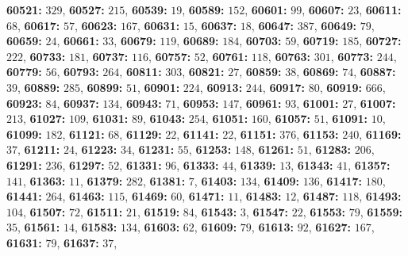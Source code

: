 \textsf{\bfseries 60521:} $329$, \textsf{\bfseries 60527:} $215$, \textsf{\bfseries 60539:} $19$, \textsf{\bfseries 60589:} $152$, \textsf{\bfseries 60601:} $99$, \textsf{\bfseries 60607:} $23$, \textsf{\bfseries 60611:} $68$, \textsf{\bfseries 60617:} $57$, \textsf{\bfseries 60623:} $167$, \textsf{\bfseries 60631:} $15$, \textsf{\bfseries 60637:} $18$, \textsf{\bfseries 60647:} $387$, \textsf{\bfseries 60649:} $79$, \textsf{\bfseries 60659:} $24$, \textsf{\bfseries 60661:} $33$, \textsf{\bfseries 60679:} $119$, \textsf{\bfseries 60689:} $184$, \textsf{\bfseries 60703:} $59$, \textsf{\bfseries 60719:} $185$, \textsf{\bfseries 60727:} $222$, \textsf{\bfseries 60733:} $181$, \textsf{\bfseries 60737:} $116$, \textsf{\bfseries 60757:} $52$, \textsf{\bfseries 60761:} $118$, \textsf{\bfseries 60763:} $301$, \textsf{\bfseries 60773:} $244$, \textsf{\bfseries 60779:} $56$, \textsf{\bfseries 60793:} $264$, \textsf{\bfseries 60811:} $303$, \textsf{\bfseries 60821:} $27$, \textsf{\bfseries 60859:} $38$, \textsf{\bfseries 60869:} $74$, \textsf{\bfseries 60887:} $39$, \textsf{\bfseries 60889:} $285$, \textsf{\bfseries 60899:} $51$, \textsf{\bfseries 60901:} $224$, \textsf{\bfseries 60913:} $244$, \textsf{\bfseries 60917:} $80$, \textsf{\bfseries 60919:} $666$, \textsf{\bfseries 60923:} $84$, \textsf{\bfseries 60937:} $134$, \textsf{\bfseries 60943:} $71$, \textsf{\bfseries 60953:} $147$, \textsf{\bfseries 60961:} $93$, \textsf{\bfseries 61001:} $27$, \textsf{\bfseries 61007:} $213$, \textsf{\bfseries 61027:} $109$, \textsf{\bfseries 61031:} $89$, \textsf{\bfseries 61043:} $254$, \textsf{\bfseries 61051:} $160$, \textsf{\bfseries 61057:} $51$, \textsf{\bfseries 61091:} $10$, \textsf{\bfseries 61099:} $182$, \textsf{\bfseries 61121:} $68$, \textsf{\bfseries 61129:} $22$, \textsf{\bfseries 61141:} $22$, \textsf{\bfseries 61151:} $376$, \textsf{\bfseries 61153:} $240$, \textsf{\bfseries 61169:} $37$, \textsf{\bfseries 61211:} $24$, \textsf{\bfseries 61223:} $34$, \textsf{\bfseries 61231:} $55$, \textsf{\bfseries 61253:} $148$, \textsf{\bfseries 61261:} $51$, \textsf{\bfseries 61283:} $206$, \textsf{\bfseries 61291:} $236$, \textsf{\bfseries 61297:} $52$, \textsf{\bfseries 61331:} $96$, \textsf{\bfseries 61333:} $44$, \textsf{\bfseries 61339:} $13$, \textsf{\bfseries 61343:} $41$, \textsf{\bfseries 61357:} $141$, \textsf{\bfseries 61363:} $11$, \textsf{\bfseries 61379:} $282$, \textsf{\bfseries 61381:} $7$, \textsf{\bfseries 61403:} $134$, \textsf{\bfseries 61409:} $136$, \textsf{\bfseries 61417:} $180$, \textsf{\bfseries 61441:} $264$, \textsf{\bfseries 61463:} $115$, \textsf{\bfseries 61469:} $60$, \textsf{\bfseries 61471:} $11$, \textsf{\bfseries 61483:} $12$, \textsf{\bfseries 61487:} $118$, \textsf{\bfseries 61493:} $104$, \textsf{\bfseries 61507:} $72$, \textsf{\bfseries 61511:} $21$, \textsf{\bfseries 61519:} $84$, \textsf{\bfseries 61543:} $3$, \textsf{\bfseries 61547:} $22$, \textsf{\bfseries 61553:} $79$, \textsf{\bfseries 61559:} $35$, \textsf{\bfseries 61561:} $14$, \textsf{\bfseries 61583:} $134$, \textsf{\bfseries 61603:} $62$, \textsf{\bfseries 61609:} $79$, \textsf{\bfseries 61613:} $92$, \textsf{\bfseries 61627:} $167$, \textsf{\bfseries 61631:} $79$, \textsf{\bfseries 61637:} $37$, 
